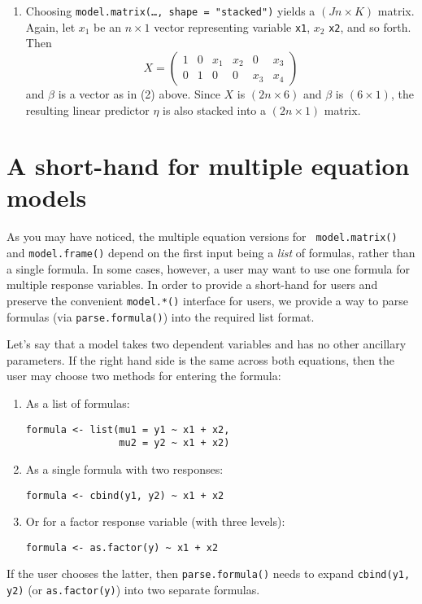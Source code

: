 \documentclass[oneside,letterpaper,12pt]{article}
\begin{document}
\begin{enumerate}
\item Choosing {\tt model.matrix(\dots, shape = "stacked")} yields a
$(Jn \times K)$ matrix.  Again, let $x_1$ be an $n \times 1$ vector
representing variable {\tt x1}, $x_2$ {\tt x2}, and so forth.  Then
\begin{equation*}
X = \left (\begin{array}{cccccc}
1 & 0 & x_1 & x_2 & 0   & x_3  \\ 
0 & 1 & 0   & 0   & x_3 & x_4
\end{array} \right) 
\end{equation*}
and $\beta$ is a vector as in (2) above.  Since $X$ is $(2n \times 6)$
and $\beta$ is $(6 \times 1)$, the resulting linear predictor $\eta$
is also stacked into a $(2n \times 1)$ matrix.  
\end{enumerate}

\section{A short-hand for multiple equation models}  

As you may have noticed, the multiple equation versions for {\tt
model.matrix()} and {\tt model.frame()} depend on the first input
being a \emph{list} of formulas, rather than a single formula.  In
some cases, however, a user may want to use one formula for multiple
response variables.  In order to provide a short-hand for users and
preserve the convenient {\tt model.*()} interface for users, we
provide a way to parse formulas (via {\tt parse.formula()}) into the
required list format.  

Let's say that a model takes two dependent variables and has no other
ancillary parameters.  If the right hand side is the same across both
equations, then the user may choose two methods for entering
the formula:  
\begin{enumerate}
\item As a list of formulas:  
\begin{verbatim}
formula <- list(mu1 = y1 ~ x1 + x2, 
                mu2 = y2 ~ x1 + x2)
\end{verbatim} 
\item As a single formula with two responses: 
\begin{verbatim}
formula <- cbind(y1, y2) ~ x1 + x2
\end{verbatim}   
\item Or for a factor response variable (with three levels): 
\begin{verbatim}
formula <- as.factor(y) ~ x1 + x2
\end{verbatim}
\end{enumerate}
If the user chooses the latter, then {\tt parse.formula()} needs to
expand {\tt cbind(y1, y2)} (or {\tt as.factor(y)}) into two separate
formulas.
\end{document}
